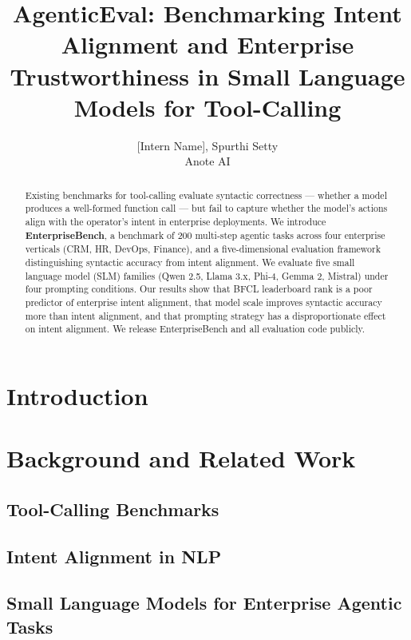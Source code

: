 \documentclass{article}
\title{AgenticEval: Benchmarking Intent Alignment and Enterprise Trustworthiness in Small Language Models for Tool-Calling}
\author{[Intern Name], Spurthi Setty \\
Anote AI}
\date{}
\begin{document}
\maketitle

\begin{abstract}
\noindent
Existing benchmarks for tool-calling evaluate syntactic correctness --- whether a model produces a well-formed function call --- but fail to capture whether the model's actions align with the operator's intent in enterprise deployments. We introduce \textbf{EnterpriseBench}, a benchmark of 200 multi-step agentic tasks across four enterprise verticals (CRM, HR, DevOps, Finance), and a five-dimensional evaluation framework distinguishing syntactic accuracy from intent alignment. We evaluate five small language model (SLM) families (Qwen 2.5, Llama 3.x, Phi-4, Gemma 2, Mistral) under four prompting conditions. Our results show that BFCL leaderboard rank is a poor predictor of enterprise intent alignment, that model scale improves syntactic accuracy more than intent alignment, and that prompting strategy has a disproportionate effect on intent alignment. We release EnterpriseBench and all evaluation code publicly.
\end{abstract}

\section{Introduction}

\section{Background and Related Work}
\subsection{Tool-Calling Benchmarks}
\subsection{Intent Alignment in NLP}
\subsection{Small Language Models for Enterprise Agentic Tasks}
\end{document}
